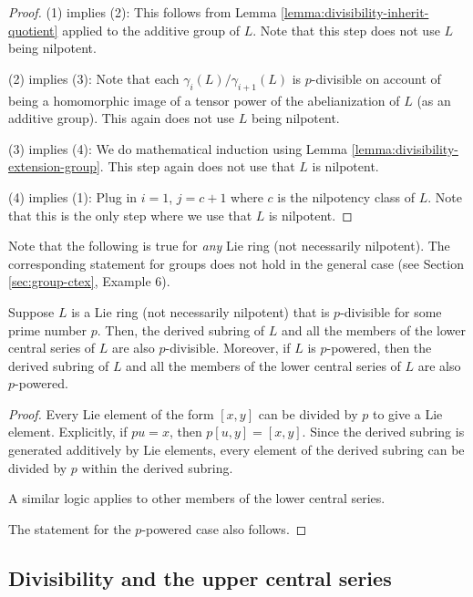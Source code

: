 \begin{proof}
  (1) implies (2): This follows from Lemma
  \ref{lemma:divisibility-inherit-quotient} applied to the additive group of
  $L$. Note that this step does not use $L$ being nilpotent.

  (2) implies (3): Note that each $\gamma_i(L)/\gamma_{i+1}(L)$ is
  $p$-divisible on account of being a homomorphic image of a tensor
  power of the abelianization of $L$ (as an additive group). This
  again does not use $L$ being nilpotent.

  (3) implies (4): We do mathematical induction using Lemma
  \ref{lemma:divisibility-extension-group}. This step again does not use
  that $L$ is nilpotent.

  (4) implies (1): Plug in $i = 1$, $j = c + 1$ where $c$ is the
  nilpotency class of $L$. Note that this is the only step where we
  use that $L$ is nilpotent.
\end{proof}

Note that the following is true for {\em any} Lie ring (not
necessarily nilpotent). The corresponding statement for groups does
not hold in the general case (see Section \ref{sec:group-ctex},
Example 6).

\begin{lemma}\label{lemma:lie-ring-lcs-divisibility}
  Suppose $L$ is a Lie ring (not necessarily nilpotent) that is
  $p$-divisible for some prime number $p$. Then, the derived subring
  of $L$ and all the members of the lower central series of $L$ are
  also $p$-divisible. Moreover, if $L$ is $p$-powered, then the
  derived subring of $L$ and all the members of the lower central
  series of $L$ are also $p$-powered.
\end{lemma}

\begin{proof}
  Every Lie element of the form $[x,y]$ can be divided by $p$ to give
  a Lie element. Explicitly, if $pu = x$, then $p[u,y] = [x,y]$. Since
  the derived subring is generated additively by Lie elements, every
  element of the derived subring can be divided by $p$ within the
  derived subring.

  A similar logic applies to other members of the lower central series.

  The statement for the $p$-powered case also follows.
\end{proof}

\subsection{Divisibility and the upper central series}


